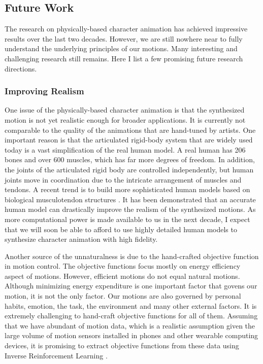 \subsection{Future Work}

The research on physically-based character animation has achieved impressive results over the last two decades. However, we are still nowhere near to fully understand the underlying principles of our motions. Many interesting and challenging research still remains. Here I list a few promising future research directions.

\subsubsection{Improving Realism}

One issue of the physically-based character animation is that the synthesized motion is not yet realistic enough for broader applications. It is currently not comparable to the quality of the animations that are hand-tuned by artists. One important reason is that the articulated rigid-body system that are widely used today is a vast simplification of the real human model. A real human has 206 bones and over 600 muscles, which has far more degrees of freedom. In addition, the joints of the articulated rigid body are controlled independently, but human joints move in coordination due to the intricate arrangement of muscles and tendons. A recent trend is to build more sophisticated human models based on biological musculotendon structures \cite{}. It has been demonstrated that an accurate human model can drastically improve the realism of the synthesized motions. As more computational power is made available to us in the next decade, I expect that we will soon be able to afford to use highly detailed human models to synthesize character animation with high fidelity.

Another source of the unnaturalness is due to the hand-crafted objective function in motion control. The objective functions focus mostly on energy efficiency aspect of motions. However, efficient motions do not equal natural motions. Although minimizing energy expenditure is one important factor that govens our motion, it is not the only factor. Our motions are also governed by personal habits, emotion, the task, the environment and many other external factors. It is extremely challenging to hand-craft objective functions for all of them. Assuming that we have abundant of motion data, which is a realistic assumption given the large volume of motion sensors installed in phones and other wearable computing devices, it is promising to extract objective functions from these data using Inverse Reinforcement Learning \cite{}.


